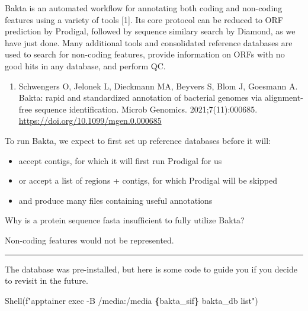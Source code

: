 \documentclass[
]{book}
\newenvironment{Shaded}{\begin{snugshade}}{\end{snugshade}}
\newcommand{\NormalTok}[1]{#1}
\newcommand{\SpecialCharTok}[1]{\textcolor[rgb]{0.81,0.36,0.00}{\textbf{#1}}}
\newcommand{\SpecialStringTok}[1]{\textcolor[rgb]{0.31,0.60,0.02}{#1}}
\providecommand{\tightlist}{%
  \setlength{\itemsep}{0pt}\setlength{\parskip}{0pt}}
\begin{document}
Bakta is an automated workflow for annotating both coding and non-coding features using a variety of tools {[}1{]}.
Its core protocol can be reduced to ORF prediction by Prodigal, followed by sequence similary search by Diamond, as we have just done.
Many additional tools and consolidated reference databases are used to search for non-coding features, provide information on ORFs with no good hits in any database, and perform QC.

\begin{enumerate}
\def\labelenumi{\arabic{enumi}.}
\tightlist
\item
  Schwengers O, Jelonek L, Dieckmann MA, Beyvers S, Blom J, Goesmann A. Bakta: rapid and standardized annotation of bacterial genomes via alignment-free sequence identification. Microb Genomics. 2021;7(11):000685. \url{https://doi.org/10.1099/mgen.0.000685}
\end{enumerate}

To run Bakta, we expect to first set up reference databases before it will:

\begin{itemize}
\tightlist
\item
  accept contigs, for which it will first run Prodigal for us
\item
  or accept a list of regions + contigs, for which Prodigal will be skipped
\item
  and produce many files containing useful annotations
\end{itemize}

Why is a protein sequence fasta insufficient to fully utilize Bakta?

Non-coding features would not be represented.

\begin{center}\rule{0.5\linewidth}{0.5pt}\end{center}

The database was pre-installed, but here is some code to guide you if you decide to revisit in the future.

\begin{Shaded}
\begin{Highlighting}[numbers=left,,]
\NormalTok{Shell(}\SpecialStringTok{f"apptainer exec {-}B /media:/media }\SpecialCharTok{\{}\NormalTok{bakta\_sif}\SpecialCharTok{\}}\SpecialStringTok{ bakta\_db list"}\NormalTok{)}
\end{Highlighting}
\end{Shaded}
\end{document}
